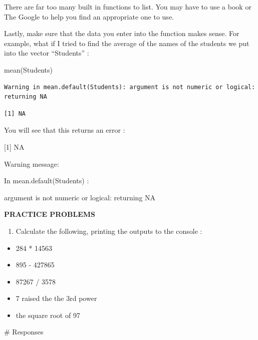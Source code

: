 \documentclass[
  letterpaper,
  DIV=11,
  numbers=noendperiod]{scrreprt}
\newenvironment{Shaded}{\begin{snugshade}}{\end{snugshade}}
\newcommand{\CommentTok}[1]{\textcolor[rgb]{0.37,0.37,0.37}{#1}}
\newcommand{\FunctionTok}[1]{\textcolor[rgb]{0.28,0.35,0.67}{#1}}
\newcommand{\NormalTok}[1]{\textcolor[rgb]{0.00,0.23,0.31}{#1}}
\providecommand{\tightlist}{%
  \setlength{\itemsep}{0pt}\setlength{\parskip}{0pt}}\usepackage{longtable,booktabs,array}
\begin{document}
There are far too many built in functions to list. You may have to use a
book or The Google to help you find an appropriate one to use.

Lastly, make sure that the data you enter into the function makes sense.
For example, what if I tried to find the average of the names of the
students we put into the vector ``Students'' :

\begin{Shaded}
\begin{Highlighting}[]
\FunctionTok{mean}\NormalTok{(Students)}
\end{Highlighting}
\end{Shaded}

\begin{verbatim}
Warning in mean.default(Students): argument is not numeric or logical:
returning NA
\end{verbatim}

\begin{verbatim}
[1] NA
\end{verbatim}

You will see that this returns an error :

{[}1{]} NA

Warning message:

In mean.default(Students) :

argument is not numeric or logical: returning NA

\textbf{PRACTICE PROBLEMS}

\begin{enumerate}
\def\labelenumi{\arabic{enumi}.}
\tightlist
\item
  Calculate the following, printing the outputs to the console :
\end{enumerate}

\begin{itemize}
\item
  284 * 14563
\item
  895 - 427865
\item
  87267 / 3578
\item
  7 raised the the 3rd power
\item
  the square root of 97
\end{itemize}

\begin{Shaded}
\begin{Highlighting}[]
\CommentTok{\# Responses}
\end{Highlighting}
\end{Shaded}
\end{document}
